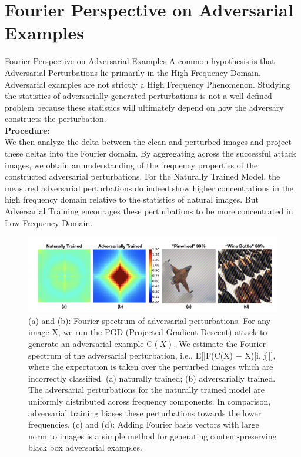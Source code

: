 \documentclass[8pt]{beamer}
\begin{document}
\section{Fourier Perspective on Adversarial Examples}
\begin{frame}[allowframebreaks]{Fourier Perspective on Adversarial Examples}
\qqaud A common hypothesis is that Adversarial Perturbations lie primarily in the High Frequency Domain. Adversarial examples are not strictly a High Frequency Phenomenon. Studying the statistics of adversarially generated perturbations is not a well defined problem because these statistics will ultimately depend on how the adversary constructs the perturbation.\\
\vspace{0.1in}
\textbf{Procedure:}\\
\qqaud We then analyze the delta between the clean and perturbed images and project these deltas into the
Fourier domain. By aggregating across the successful attack images, we obtain an understanding of the frequency properties of the constructed adversarial perturbations. For the Naturally Trained Model, the measured adversarial perturbations do indeed show higher concentrations in the high frequency domain relative to the statistics of natural images. But Adversarial Training encourages these perturbations to be more concentrated in Low Frequency Domain.\\

\framebreak

\begin{figure}
    \centering
    \includegraphics[scale=0.25]{../Images/AdversarialFourier.png}
    \caption{(a) and (b): Fourier spectrum of adversarial perturbations. For any image X, we run the PGD (Projected Gradient Descent) attack to generate an adversarial example $\mathrm{C}(X)$. We estimate the Fourier spectrum of the adversarial perturbation, i.e., E[|F(C(X) − X)[i, j]|], where the expectation is taken over the perturbed images which are incorrectly classified. (a) naturally trained; (b) adversarially trained. The adversarial perturbations for the naturally trained model are uniformly distributed across frequency components. In comparison, adversarial training biases these perturbations towards the lower frequencies. (c) and (d): Adding Fourier basis vectors with large norm to images is a simple method for generating content-preserving black box adversarial examples.}
\end{figure}
\end{frame}
\end{document}
